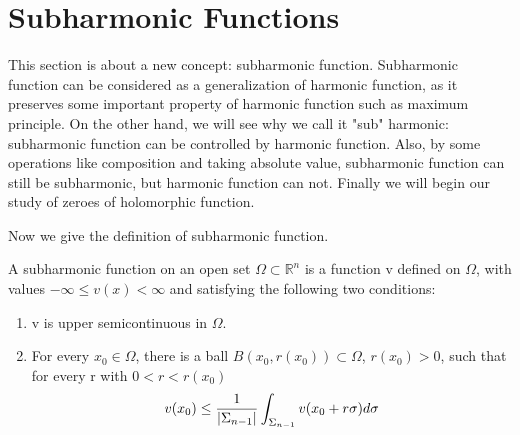 % 
\section{Subharmonic Functions}
This section is about a new concept: subharmonic function. Subharmonic function can be considered as a generalization of harmonic
function, as it preserves some important property of harmonic function such as maximum principle. On the other hand, we will see
why we call it "sub" harmonic: subharmonic function can be controlled by harmonic function. Also, by some operations like
composition and taking absolute value, subharmonic function can still be subharmonic, but harmonic function can not. Finally we will begin our study of zeroes of holomorphic function.\par

Now we give the definition of subharmonic function.
\begin{definition}
    A subharmonic function on an open set $\Omega\subset\mathbb{R}^n$ is a function v defined on $\Omega$, with values $-\infty\leq v(x)<\infty$
    and satisfying the following two conditions:
    \begin{enumerate}
        \item v is upper semicontinuous in $\Omega$.
        \item For every $x_0\in\Omega$, there is a ball $B(x_0,r(x_0))\subset\Omega$, $r(x_0)>0$, such that for every r with $0<r<r(x_0)$
              \begin{equation}
                  v(x_0)\leq\frac{1}{\left\lvert\Sigma_{n-1}\right\rvert}\int_{\Sigma_{n-1}}{v(x_0+r\sigma) d\sigma}\label{local submean property}
              \end{equation}
    \end{enumerate}
\end{definition}
